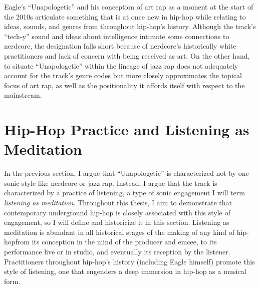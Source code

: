Eagle's ``Unapologetic'' and his conception of art rap as a moment at the start of the 2010s articulate something
that is at once new in hip-hop while relating to ideas, sounds, and genres from throughout hip-hop's history. 
Although the track's ``tech-y'' sound and ideas about intelligence intimate some connections to nerdcore, the
designation falls short because of nerdcore's historically white practitioners and lack of concern with being 
received as art. On the other hand, to situate ``Unapologetic'' within the lineage of jazz rap does not adequately
account for the track's genre codes but more closely approximates the topical focus of art rap, as well as the 
positionality it affords itself with respect to the mainstream.

\section{Hip-Hop Practice and Listening as Meditation} \label{listeningasmeditation}

In the previous section, I argue that ``Unapologetic'' is characterized not by one sonic style like
nerdcore or jazz rap. Instead, I argue that the track is characterized by a practice of listening,
a type of sonic engagement I will term \emph{listening as meditation}. Throughout this thesis, I aim
to demonstrate that contemporary underground hip-hop is closely associated with this style of engagement,
so I will define and historicize it in this section. Listening as meditation is abundant in all historical 
stages of the making of any kind of hip-hop\textemdash from its conception in the mind of the producer
and emcee, to its performance live or in studio, and eventually its reception by the listener. 
Practitioners throughout hip-hop's history (including Eagle himself) promote this style of listening,
one that engenders a deep immersion in hip-hop as a musical form.

